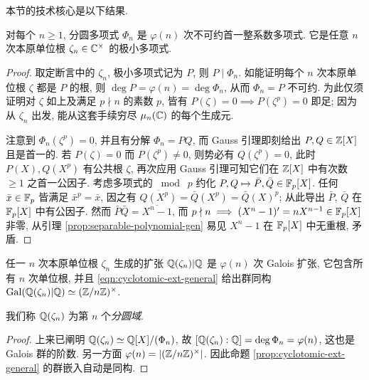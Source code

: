本节的技术核心是以下结果.
\begin{theorem}
	对每个 $n \geq 1$, 分圆多项式 $\Phi_n$ 是 $\varphi(n)$ 次不可约首一整系数多项式. 它是任意 $n$ 次本原单位根 $\zeta_n \in \mathbb{C}^\times$ 的极小多项式.
\end{theorem}
\begin{proof}
	取定断言中的 $\zeta_n$, 极小多项式记为 $P$, 则 $P \mid \Phi_n$. 如能证明每个 $n$ 次本原单位根 $\zeta$ 都是 $P$ 的根, 则 $\deg P = \varphi(n) = \deg \Phi_n$, 从而 $\Phi_n = P$ 不可约. 为此仅须证明对 $\zeta$ 如上及满足 $p \nmid n$ 的素数 $p$, 皆有 $P(\zeta)=0 \implies P(\zeta^p)=0$ 即足; 因为从 $\zeta_n$ 出发, 能从这套手续穷尽 $\mu_n(\mathbb{C})$ 的每个生成元.
	
	注意到 $\Phi_n(\zeta^p)=0$, 并且有分解 $\Phi_n = PQ$, 而 Gauss 引理即刻给出 $P,Q \in \mathbb{Z}[X]$ 且是首一的. 若 $P(\zeta)=0$ 而 $P(\zeta^p) \neq 0$, 则势必有 $Q(\zeta^p)=0$, 此时 $P(X), Q(X^p)$ 有公共根 $\zeta$, 再次应用 Gauss 引理可知它们在 $\mathbb{Z}[X]$ 中有次数 $\geq 1$ 之首一公因子. 考虑多项式的 $\bmod \; p$ 约化 $P,Q \mapsto \bar{P},\bar{Q} \in \mathbb{F}_p[X]$. 任何 $\bar{x} \in \mathbb{F}_p$ 皆满足 $\bar{x}^p = \bar{x}$, 因之有 $\overline{Q(X^p)} = \bar{Q}(X^p) = \bar{Q}(X)^p$; 从此导出 $\bar{P}$, $\bar{Q}$ 在 $\mathbb{F}_p[X]$ 中有公因子. 然而 $\bar{P}\bar{Q} = \overline{X^n-1}$, 而 $p \nmid n \implies (X^n-1)' = nX^{n-1} \in \mathbb{F}_p[X]$ 非零, 从引理 \ref{prop:separable-polynomial-gen} 易见 $X^n-1$ 在 $\mathbb{F}_p[X]$ 中无重根, 矛盾.
\end{proof}

\begin{theorem}\label{prop:cyclotomic-Galois}
	任一 $n$ 次本原单位根 $\zeta_n$ 生成的扩张 $\mathbb{Q}(\zeta_n)|\mathbb{Q}$ 是 $\varphi(n)$ 次 Galois 扩张, 它包含所有 $n$ 次单位根, 并且 \eqref{eqn:cyclotomic-ext-general} 给出群同构 $\operatorname{Gal}(\mathbb{Q}(\zeta_n)|\mathbb{Q}) \simeq (\mathbb{Z}/n\mathbb{Z})^\times$.
\end{theorem}
我们称 $\mathbb{Q}(\zeta_n)$ 为第 $n$ 个\emph{分圆域}. 
\begin{proof}
	上来已阐明 $\mathbb{Q}(\zeta_n) \simeq \mathbb{Q}[X]/(\Phi_n)$, 故 $[\mathbb{Q}(\zeta_n) : \mathbb{Q}] = \deg \Phi_n = \varphi(n)$, 这也是 Galois 群的阶数. 另一方面 $\varphi(n) = |(\mathbb{Z}/n\mathbb{Z})^\times|$. 因此命题 \ref{prop:cyclotomic-ext-general} 的群嵌入自动是同构.
\end{proof}

